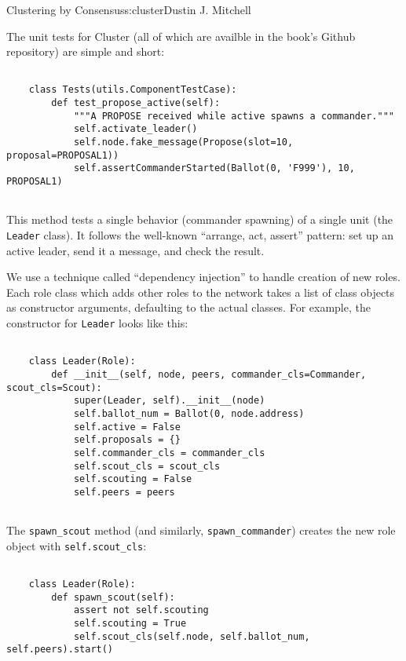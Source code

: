 \begin{aosachapter}{Clustering by Consensus}{s:cluster}{Dustin J. Mitchell}
\label{unit-testing}

The unit tests for Cluster (all of which are availble in the book's
Github repository) are simple and short:

\begin{verbatim}

    class Tests(utils.ComponentTestCase):
        def test_propose_active(self):
            """A PROPOSE received while active spawns a commander."""
            self.activate_leader()
            self.node.fake_message(Propose(slot=10, proposal=PROPOSAL1))
            self.assertCommanderStarted(Ballot(0, 'F999'), 10, PROPOSAL1)
    
\end{verbatim}

This method tests a single behavior (commander spawning) of a single
unit (the \texttt{Leader} class). It follows the well-known ``arrange,
act, assert'' pattern: set up an active leader, send it a message, and
check the result.

\label{dependency-injection}

We use a technique called ``dependency injection'' to handle creation of
new roles. Each role class which adds other roles to the network takes a
list of class objects as constructor arguments, defaulting to the actual
classes. For example, the constructor for \texttt{Leader} looks like
this:

\begin{verbatim}

    class Leader(Role):
        def __init__(self, node, peers, commander_cls=Commander, scout_cls=Scout):
            super(Leader, self).__init__(node)
            self.ballot_num = Ballot(0, node.address)
            self.active = False
            self.proposals = {}
            self.commander_cls = commander_cls
            self.scout_cls = scout_cls
            self.scouting = False
            self.peers = peers
    
\end{verbatim}

The \texttt{spawn\_scout} method (and similarly,
\texttt{spawn\_commander}) creates the new role object with
\texttt{self.scout\_cls}:

\begin{verbatim}

    class Leader(Role):
        def spawn_scout(self):
            assert not self.scouting
            self.scouting = True
            self.scout_cls(self.node, self.ballot_num, self.peers).start()
    

\end{verbatim}
\end{aosachapter}
